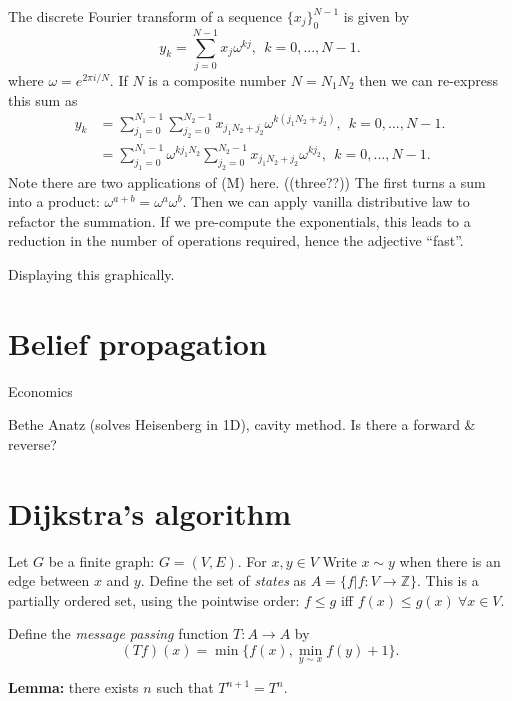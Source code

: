 \documentclass[12pt]{article}
\begin{document}
The discrete Fourier transform of a sequence $\{x_j\}_0^{N-1}$
is given by
$$
    y_k = \sum_{j=0}^{N-1} x_j \omega^{kj}, \ \ k=0,...,N-1.
$$
where $\omega=e^{2\pi i/N}.$
If $N$ is a composite number $N=N_1 N_2$ then we can re-express this sum as
\begin{align*}
    y_k &= \sum_{j_1=0}^{N_1-1} \sum_{j_2=0}^{N_2-1} x_{j_1 N_2 + j_2}
            \omega^{k (j_1 N_2 + j_2)}, \ \ k=0,...,N-1. \\
        &= \sum_{j_1=0}^{N_1-1}
            \omega^{k {j_1 N_2}}
            \sum_{j_2=0}^{N_2-1} x_{j_1 N_2 + j_2}
            \omega^{k {j_2}}, \ \ k=0,...,N-1.
\end{align*}
Note there are two applications of (M) here. ((three??))
The first turns a sum into a product: $\omega^{a+b}=\omega^a \omega^b.$
Then we can apply vanilla distributive law to refactor the summation.
If we pre-compute the exponentials, this leads to a reduction in
the number of operations required, hence the adjective ``fast''.

Displaying this graphically.

\section{Belief propagation}

Economics

Bethe Anatz (solves Heisenberg in 1D), cavity method.
Is there a forward \& reverse?

\section{Dijkstra's algorithm}

\def\Z{\mathbb Z}

Let $G$ be a finite graph: $G = (V, E).$
For $x,y\in V$ Write $x\sim y$ when there
is an edge between $x$ and $y.$ %
Define the set of \emph{states} as %
$A = \{ f | f : V \to \Z \}.$
This is a partially ordered set, using
the pointwise order:
$f\le g$ iff $f(x)\le g(x)\ \forall x\in V.$

Define the \emph{message passing} function
$T:A\to A$ by
$$(Tf)(x) = \min\{f(x), \min_{y\sim x} f(y)+1\}.$$

{\bf Lemma:} there exists $n$ such that $T^{n+1} = T^n.$
\end{document}
